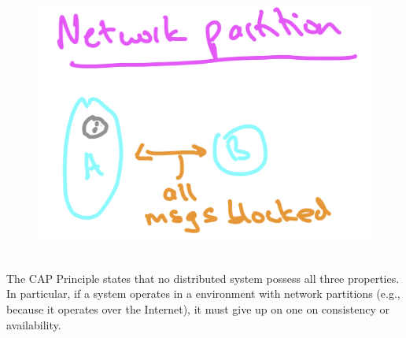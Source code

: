 \begin{figure}[h]
    \centering
    \includegraphics[scale = 0.5]{figures/f21.png}
    \caption{}
    \label{fig:mesh1}
\end{figure}\\
The CAP Principle states that no distributed system possess all three properties. In particular, if a system operates in a environment with network partitions (e.g., because it operates
over the Internet), it must give up on one on consistency or availability.\\

